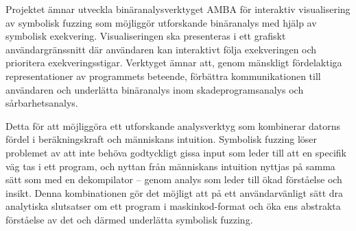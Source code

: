 
Projektet ämnar utveckla binäranalysverktyget AMBA för interaktiv visualisering
av symbolisk fuzzing som möjliggör utforskande binäranalys med hjälp av
symbolisk exekvering. Visualiseringen ska presenteras i ett grafiskt
användargränssnitt där användaren kan interaktivt följa exekveringen och
prioritera exekveringsstigar. Verktyget ämnar att, genom mänskligt fördelaktiga
representationer av programmets beteende, förbättra kommunikationen till
användaren och underlätta binäranalys inom skadeprogramsanalys och
sårbarhetsanalys.

Detta för att möjliggöra ett utforskande analysverktyg som kombinerar datorns
fördel i beräkningskraft och människans intuition. Symbolisk fuzzing
löser problemet av att inte behöva godtyckligt gissa input som leder till att
en specifik väg tas i ett program, och nyttan från människans intuition nyttjas
på samma sätt som med en dekompilator -- genom analys som leder till ökad
förståelse och insikt. Denna kombinationen gör det möjligt att på ett
användarvänligt sätt dra analytiska slutsatser om ett program i
maskinkod-format och öka ens abstrakta förståelse av det och därmed underlätta
symbolisk fuzzing.

